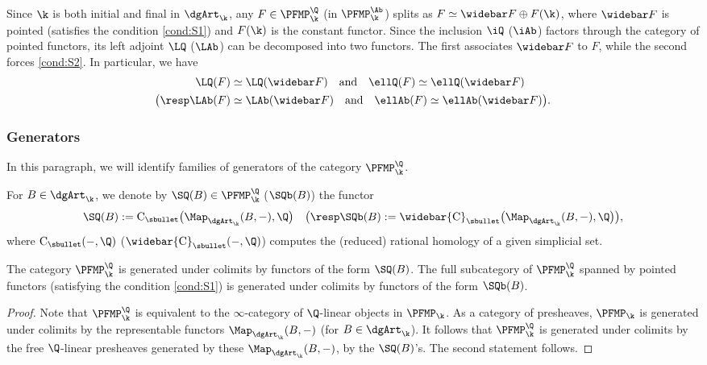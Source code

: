 \begin{rmq}\label{rmq:lbar}
Since $\k$ is both initial and final in $\dgArt_\k$, any $F \in \PFMP_\k^\Q$ (\resp in $\PFMP_\k^\Ab$) splits as $F \simeq \widebar F \oplus F(\k)$, where $\widebar F$ is pointed (\ie satisfies the condition \eqref{cond:S1}) and $F(\k)$ is the constant functor.
Since the inclusion $\iQ$ (\resp $\iAb$) factors through the category of pointed functors, its left adjoint $\LQ$ (\resp $\LAb$) can be decomposed into two functors. The first associates $\widebar F$ to $F$, while the second forces \eqref{cond:S2}.
In particular, we have
\begin{align*}
\LQ(F) &\simeq \LQ(\widebar F) \quad\text{and}\quad \ellQ(F) \simeq \ellQ(\widebar F) \\
\bigl(\resp \LAb(F) &\simeq \LAb(\widebar F) \quad\text{and}\quad \ellAb(F) \simeq \ellAb(\widebar F) \bigr).
\end{align*}
\end{rmq}

\subsubsection{Generators}
In this paragraph, we will identify families of generators of the category $\PFMP_\k^\Q$.
\begin{df}
For $B \in \dgArt_\k$, we denote by $\SQ(B) \in \PFMP_\k^\Q$ (\resp $\SQb(B)$) the functor
\[
\SQ(B) := \mathrm{C}_\sbullet \bigl( \Map_{\dgArt_\k}(B,-), \Q \bigr) \quad \bigl(\resp 
\SQb(B) := \widebar{\mathrm{C}}_\sbullet \bigl( \Map_{\dgArt_\k}(B,-), \Q \bigr) \bigr),
\]
where $\mathrm{C}_\sbullet(-,\Q)$ (\resp $\widebar{\mathrm{C}}_\sbullet(-,\Q)$) computes the (reduced) rational homology of a given simplicial set.
\end{df}

\begin{lem}\label{lem:generateurs}
The category $\PFMP_\k^\Q$ is generated under colimits by functors of the form $\SQ(B)$.
The full subcategory of $\PFMP_\k^\Q$ spanned by pointed functors (\ie satisfying the condition \eqref{cond:S1}) is generated under colimits by functors of the form $\SQb(B)$.
\end{lem}

\begin{proof}
Note that $\PFMP_\k^\Q$ is equivalent to the $\infty$-category of $\Q$-linear objects in $\PFMP_\k$. As a category of presheaves, $\PFMP_\k$ is generated under colimits by the representable functors $\Map_{\dgArt_\k}(B,-)$ (for $B \in \dgArt_\k$).
It follows that $\PFMP_\k^\Q$ is generated under colimits by the free $\Q$-linear presheaves generated by these $\Map_{\dgArt_\k}(B,-)$, \ie by the $\SQ(B)$'s.
The second statement follows.
\end{proof}

